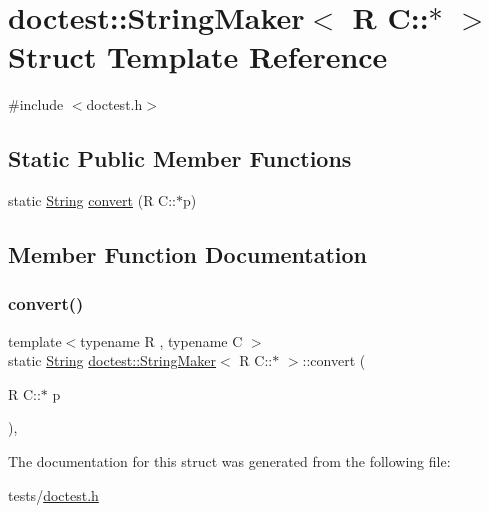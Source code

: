 \hypertarget{structdoctest_1_1StringMaker_3_01R_01C_1_1_5_01_4}{}\section{doctest\+:\+:String\+Maker$<$ R C\+:\+:$\ast$ $>$ Struct Template Reference}
\label{structdoctest_1_1StringMaker_3_01R_01C_1_1_5_01_4}


{\ttfamily \#include $<$doctest.\+h$>$}

\subsection*{Static Public Member Functions}
\begin{DoxyCompactItemize}
\item 
static \hyperlink{classdoctest_1_1String}{String} \hyperlink{structdoctest_1_1StringMaker_3_01R_01C_1_1_5_01_4_a06144903aacd73ed31c2fb043be8abb0}{convert} (R C\+::$\ast$p)
\end{DoxyCompactItemize}


\subsection{Member Function Documentation}
\mbox{\label{structdoctest_1_1StringMaker_3_01R_01C_1_1_5_01_4_a06144903aacd73ed31c2fb043be8abb0}} 
\subsubsection{\texorpdfstring{convert()}{convert()}}
{\footnotesize\ttfamily template$<$typename R , typename C $>$ \\
static \hyperlink{classdoctest_1_1String}{String} \hyperlink{structdoctest_1_1StringMaker}{doctest\+::\+String\+Maker}$<$ R C\+::$\ast$ $>$\+::convert (\begin{DoxyParamCaption}\item[{R C\+::$\ast$}]{p }\end{DoxyParamCaption})\hspace{0.3cm}{\ttfamily [inline]}, {\ttfamily [static]}}



The documentation for this struct was generated from the following file\+:\begin{DoxyCompactItemize}
\item 
tests/\hyperlink{doctest_8h}{doctest.\+h}\end{DoxyCompactItemize}
